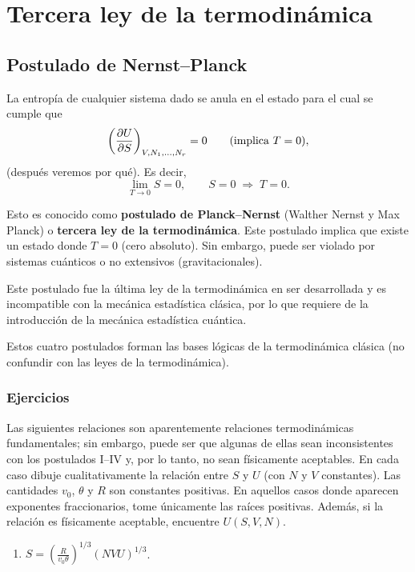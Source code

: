 \chapter{Tercera ley de la termodinámica}

\section{Postulado de Nernst--Planck}

\begin{postulado}
  La entropía de cualquier sistema dado se anula en el estado para el cual se cumple que
  \begin{equation*}
    \left(\frac{\partial U}{\partial S}\right)_{V,N_1,\dots,N_r}=0\qquad(\text{implica }T=0),
  \end{equation*}
  (después veremos por qué). Es decir,
  \begin{equation*}
    \lim_{T\to0}S=0,\qquad S=0\;\Longrightarrow\;T=0.
  \end{equation*}
\end{postulado}

Esto es conocido como \textbf{postulado de Planck--Nernst} (Walther Nernst y Max Planck) o
\textbf{tercera ley de la termodinámica}. Este postulado implica que existe un estado donde $T=0$
(cero absoluto). Sin embargo, puede ser violado por sistemas cuánticos o no extensivos
(gravitacionales).

Este postulado fue la última ley de la termodinámica en ser desarrollada y es incompatible con la
mecánica estadística clásica, por lo que requiere de la introducción de la mecánica estadística
cuántica.

Estos cuatro postulados forman las bases lógicas de la termodinámica clásica (no confundir con las
leyes de la termodinámica).

\subsection*{Ejercicios}

\begin{ejercicio}
  Las siguientes relaciones son aparentemente relaciones termodinámicas fundamentales; sin embargo,
  puede ser que algunas de ellas sean inconsistentes con los postulados I--IV y, por lo tanto, no
  sean físicamente aceptables. En cada caso dibuje cualitativamente la relación entre $S$ y $U$
  (con $N$ y $V$ constantes). Las cantidades $v_0$, $\theta$ y $R$ son constantes positivas. En
  aquellos casos donde aparecen exponentes fraccionarios, tome únicamente las raíces positivas.
  Además, si la relación es físicamente aceptable, encuentre $U(S,V,N)$.
  \begin{enumerate}[label=\alph*),itemsep=2pt]
    \item $\displaystyle S=\left(\frac{R}{v_0\theta}\right)^{\!1/3}(NVU)^{1/3}$.
  \end{enumerate}
\end{ejercicio}

